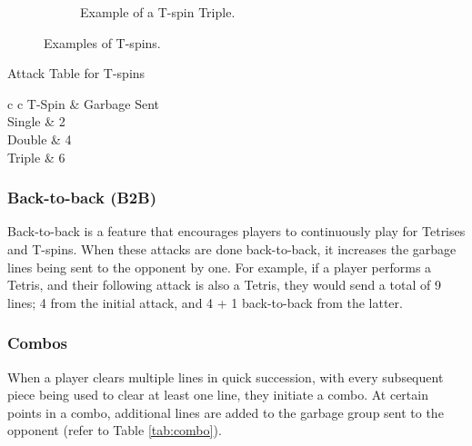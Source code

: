 \documentclass[a4paper, 12pt]{extreport}
\begin{document}
\begin{figure}
\begin{subfigure}{\textwidth}
\begin{minipage}{.2\textwidth}
			\end{minipage}
			\caption{Example of a T-spin Triple.}
			\label{fig:t-spin-triple}
		\end{subfigure}
		\caption{Examples of T-spins.}
	\end{figure}
	
	\begin{table}
		\centering
		\caption{Attack Table for T-spins}
		\label{tab:t-spin}
		\begin{tblr}{c c}
			\hline
			T-Spin & Garbage Sent\\
			\hline
			Single & 2\\
			Double & 4\\
			Triple & 6\\
		\end{tblr}
	\end{table}
	
	\subsubsection{Back-to-back (B2B)}
	
	Back-to-back is a feature that encourages players to continuously play for Tetrises and T-spins. When these attacks are done back-to-back, it increases the garbage lines being sent to the opponent by one. For example, if a player performs a Tetris, and their following attack is also a Tetris, they would send a total of 9 lines; 4 from the initial attack, and 4 + 1 back-to-back from the latter.
	
	\subsubsection{Combos}\label{subsubsec:combos}
	
	When a player clears multiple lines in quick succession, with every subsequent piece being used to clear at least one line, they initiate a combo. At certain points in a combo, additional lines are added to the garbage group sent to the opponent (refer to Table \ref{tab:combo}). 
	
\end{document}

